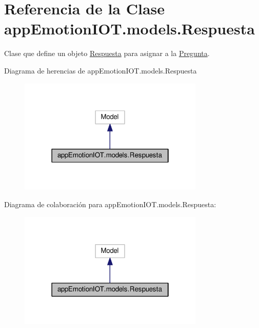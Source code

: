 \hypertarget{classappEmotionIOT_1_1models_1_1Respuesta}{}\section{Referencia de la Clase app\+Emotion\+I\+O\+T.\+models.\+Respuesta}
\label{classappEmotionIOT_1_1models_1_1Respuesta}


Clase que define un objeto \hyperlink{classappEmotionIOT_1_1models_1_1Respuesta}{Respuesta} para asignar a la \hyperlink{classappEmotionIOT_1_1models_1_1Pregunta}{Pregunta}.  




Diagrama de herencias de app\+Emotion\+I\+O\+T.\+models.\+Respuesta
\nopagebreak
\begin{figure}[H]
\begin{center}
\leavevmode
\includegraphics[width=250pt]{classappEmotionIOT_1_1models_1_1Respuesta__inherit__graph}
\end{center}
\end{figure}


Diagrama de colaboración para app\+Emotion\+I\+O\+T.\+models.\+Respuesta\+:
\nopagebreak
\begin{figure}[H]
\begin{center}
\leavevmode
\includegraphics[width=250pt]{classappEmotionIOT_1_1models_1_1Respuesta__coll__graph}
\end{center}
\end{figure}
